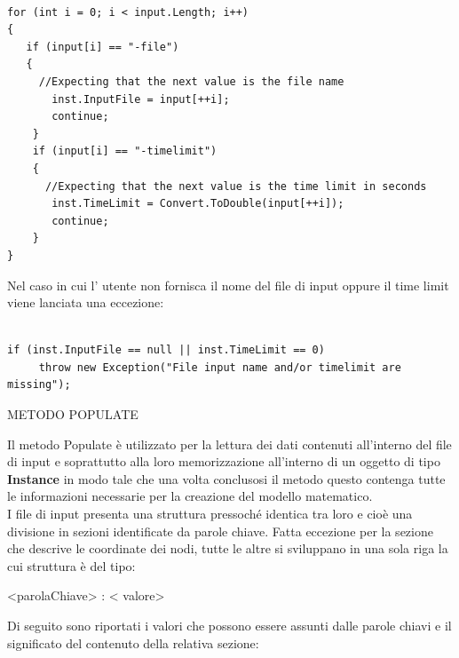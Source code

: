 \documentclass[11pt]{article}
\begin{document}
\begin{lstlisting}

for (int i = 0; i < input.Length; i++)
{
   if (input[i] == "-file")
   {
     //Expecting that the next value is the file name
       inst.InputFile = input[++i];
       continue;
    }
    if (input[i] == "-timelimit")
    {
      //Expecting that the next value is the time limit in seconds
       inst.TimeLimit = Convert.ToDouble(input[++i]);
       continue;
    }
}               
\end{lstlisting}

Nel caso in cui l' utente non fornisca il nome del file di input oppure il time limit viene lanciata una eccezione:

\begin{lstlisting}

if (inst.InputFile == null || inst.TimeLimit == 0)
     throw new Exception("File input name and/or timelimit are missing");

\end{lstlisting}


\vspace{2\baselineskip}
METODO POPULATE
\vspace{2\baselineskip}

Il metodo Populate è utilizzato per la lettura dei dati contenuti all'interno del file di input e soprattutto alla loro memorizzazione all'interno di un oggetto di tipo \textbf{Instance} in modo tale che una volta conclusosi il metodo questo contenga tutte le informazioni necessarie per la creazione del modello matematico.\\
I file di input presenta una struttura pressoché identica tra loro e cioè una divisione in sezioni identificate da parole chiave. Fatta eccezione per la sezione che descrive le coordinate dei nodi, tutte le altre si sviluppano in una sola riga la cui struttura è del tipo:

\begin{center}
<parolaChiave> : < valore> 
\end{center}

Di seguito sono riportati i valori che possono essere assunti dalle parole chiavi e il significato del contenuto della relativa sezione: 
\end{document}

